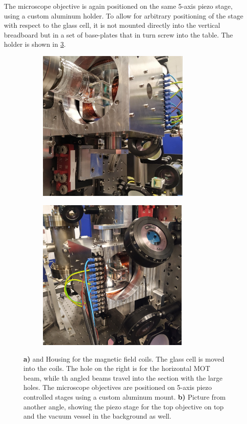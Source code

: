 The microscope objective is again positioned on the same 5-axis piezo stage, using a custom aluminum holder.
To allow for arbitrary positioning of the stage with respect to the glass cell, it is not mounted directly into the vertical breadboard but in a set of base-plates that in turn screw into the table.
The holder is shown in \cref{fig:Coils}.

\begin{figure}
	\begin{subfigure}{.49\linewidth}
		\flushleft
		\includegraphics[height=7.6cm]{figures/CoilsCropped.jpg}
		\caption{}
		\label{fig:Coils1}
	\end{subfigure}
	\hfill
	\begin{subfigure}{.49\linewidth}
		\flushright
		\includegraphics[height=7.6cm]{figures/CoilsCropped2.jpg}
		\caption{}
		\label{fig:Coils2}
	\end{subfigure}
	\caption{
	\textsf{\textbf{a)}} and  Housing for the magnetic field coils. The glass cell is moved into the coils. 
    The hole on the right is for the horizontal MOT beam, while th angled beams travel into the section with the large holes. The microscope objectives are positioned on 5-axis piezo controlled stages using a custom aluminum mount. 
    \textsf{\textbf{b)}} Picture from another angle, showing the piezo stage for the top objective on top and the vacuum vessel in the background as well. 
    }
    \label{fig:Coils}
\end{figure}


